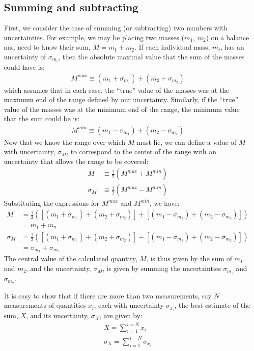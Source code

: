 \subsection{Summing and subtracting}
First, we consider the case of summing (or subtracting) two numbers with uncertainties. For example, we may be placing two masses ($m_1$, $m_2$) on a balance and need to know their sum, $M=m_1+m_2$. If each individual mass, $m_i$, has an uncertainty of $\sigma_{m_i}$, then the absolute maximal value that the sum of the masses could have is:
\begin{align}
M^{max}\equiv(m_1+\sigma_{m_1})+(m_2+\sigma_{m_2})
\end{align}
which assumes that in each case, the ``true'' value of the masses was at the maximum end of the range defined by our uncertainty. Similarly, if the ``true'' value of the masses was at the minimum end of the range, the minimum value that the sum could be is:
\begin{align}
M^{min}\equiv(m_1-\sigma_{m_1})+(m_2-\sigma_{m_2})
\end{align}
Now that we know the range over which $M$ must lie, we can define a value of $M$ with uncertainty, $\sigma_{M}$, to correspond to the center of the range with an uncertainty that allows the range to be covered:
\begin{align}
M&\equiv\frac{1}{2}(M^{max}+M^{min})\nonumber\\
\sigma_{M}&\equiv\frac{1}{2}(M^{max}-M^{min})
\end{align}
Substituting the expressions for $M^{max}$ and $M^{min}$, we have:
\begin{align}
M&=\frac{1}{2}\left(\left[(m_1+\sigma_{m_1})+(m_2+\sigma_{m_2})\right]+ \left[(m_1-\sigma_{m_1})+(m_2-\sigma_{m_2})\right]\right)\nonumber\\
 &=m_1+m_2\nonumber\\
\sigma_{M}&=\frac{1}{2}\left(\left[(m_1+\sigma_{m_1})+(m_2+\sigma_{m_2})\right]-\left[(m_1-\sigma_{m_1})+(m_2-\sigma_{m_2})\right]\right) \nonumber\\
 &=\sigma_{m_1}+ \sigma_{m_2}
\end{align}
The central value of the calculated quantity, $M$, is thus given by the sum of $m_1$ and $m_2$, and the uncertainty, $\sigma_{M}$, is given by summing the uncertainties $\sigma_{m_1}$ and $\sigma_{m_2}$.

It is easy to show that if there are more than two measurements, say $N$ measurements of quantities $x_i$, each with uncertainty $\sigma_{x_i}$, the best estimate of the sum, $X$, and its uncertainty, $\sigma_X$, are given by:
\begin{align}
X=\sum_{i=1}^{i=N}x_i\nonumber\\
\sigma_X=\sum_{i=1}^{i=N}\sigma_{x_i}
\end{align}

